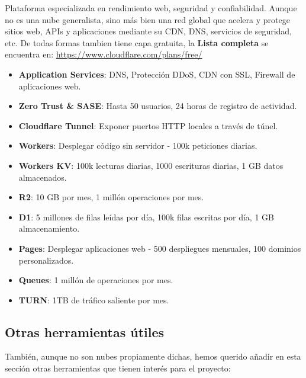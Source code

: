 Plataforma especializada en rendimiento web, seguridad y confiabilidad. Aunque no es una nube generalista, sino más bien una red global que acelera y protege sitios web, APIs y aplicaciones mediante su CDN, DNS, servicios de seguridad, etc. De todas formas tambien tiene capa gratuita, la \textbf{Lista completa} se encuentra en: \url{https://www.cloudflare.com/plans/free/}

\begin{itemize}
	\item \textbf{Application Services}: DNS, Protección DDoS, CDN con SSL, Firewall de aplicaciones web.
	\item \textbf{Zero Trust \& SASE}: Hasta 50 usuarios, 24 horas de registro de actividad.
	\item \textbf{Cloudflare Tunnel}: Exponer puertos HTTP locales a través de túnel.
	\item \textbf{Workers}: Desplegar código sin servidor - 100k peticiones diarias.
	\item \textbf{Workers KV}: 100k lecturas diarias, 1000 escrituras diarias, 1 GB datos almacenados.
	\item \textbf{R2}: 10 GB por mes, 1 millón operaciones por mes.
	\item \textbf{D1}: 5 millones de filas leídas por día, 100k filas escritas por día, 1 GB almacenamiento.
	\item \textbf{Pages}: Desplegar aplicaciones web - 500 despliegues mensuales, 100 dominios personalizados.
	\item \textbf{Queues}: 1 millón de operaciones por mes.
	\item \textbf{TURN}: 1TB de tráfico saliente por mes.
\end{itemize}

\subsection{Otras herramientas útiles}

También, aunque no son nubes propiamente dichas, hemos querido añadir en esta sección otras herramientas que tienen interés para el proyecto:

